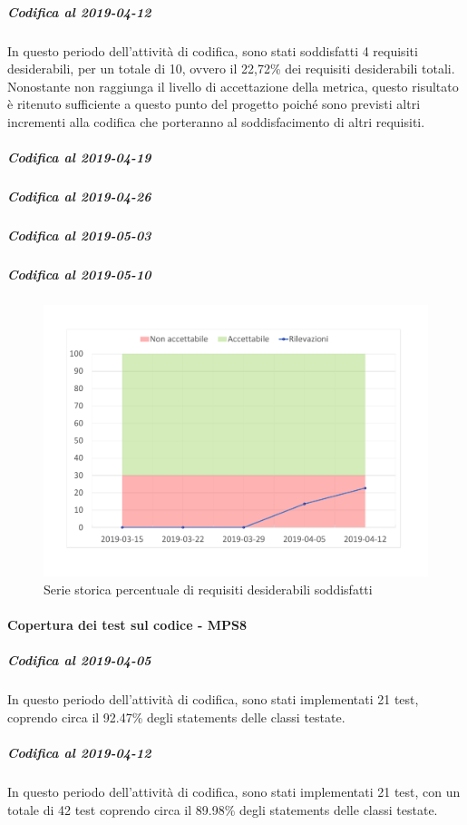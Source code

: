 \subparagraph{Codifica al 2019-04-12}
In questo periodo dell'attività di codifica, sono stati soddisfatti 4 requisiti desiderabili, per un totale di 10, ovvero il 22,72\% dei requisiti desiderabili totali.
Nonostante non raggiunga il livello di accettazione della
metrica, questo risultato è ritenuto sufficiente a questo punto del progetto poiché sono previsti altri incrementi alla codifica che porteranno al soddisfacimento di altri requisiti.

\subparagraph{Codifica al 2019-04-19}

\subparagraph{Codifica al 2019-04-26}

\subparagraph{Codifica al 2019-05-03}

\subparagraph{Codifica al 2019-05-10}

\begin{figure}[H]
	\centering
	\includegraphics[scale=0.6]{images/resoconto/MPS7Chart.pdf}
	\caption{Serie storica percentuale di requisiti desiderabili soddisfatti}	
\end{figure}

\paragraph{Copertura dei test sul codice - MPS8}
\subparagraph{Codifica al 2019-04-05}
In questo periodo dell'attività di codifica, sono stati implementati 21 test, coprendo circa il 92.47\% degli statements delle classi testate.

\subparagraph{Codifica al 2019-04-12}
In questo periodo dell'attività di codifica, sono stati implementati 21 test, con un totale di 42 test coprendo circa il 89.98\% degli statements delle classi testate.


